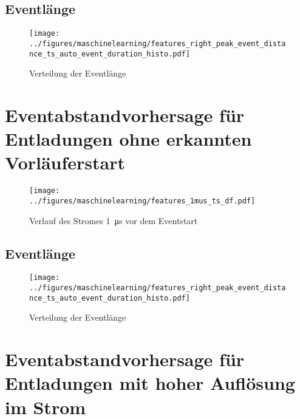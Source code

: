 \subsection{Eventlänge}

\begin{figure}[htbp]
    \centering
      \texttt{[image: ../figures/maschinelearning/features\_right\_peak\_event\_distance\_ts\_auto\_event\_duration\_histo.pdf]}
      \caption{Verteilung der Eventlänge}
      \label{fig:event_right_event_duration_box}
\end{figure}



\section{Eventabstandvorhersage für Entladungen ohne erkannten Vorläuferstart}

\begin{figure}[htbp]
    \centering
      \texttt{[image: ../figures/maschinelearning/features\_1mus\_ts\_df.pdf]}
      \caption{Verlauf des Stromes \SI{1}{\micro\second} vor dem Eventstart}
      \label{fig:1mus-current-sliece}
\end{figure}

\subsection{Eventlänge}

\begin{figure}[htbp]
    \centering
      \texttt{[image: ../figures/maschinelearning/features\_right\_peak\_event\_distance\_ts\_auto\_event\_duration\_histo.pdf]}
      \caption{Verteilung der Eventlänge}
      \label{fig:1mus-event-duration-box}
\end{figure}






\section{Eventabstandvorhersage für Entladungen mit hoher Auflösung im Strom}

